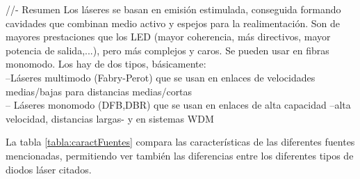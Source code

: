 \begin{itemize}
\begin{itemize}
 					\textcolor{rositaoscuro}{//- Resumen Los láseres se basan en emisión estimulada, conseguida formando cavidades que combinan medio activo y espejos para la realimentación. Son de mayores prestaciones que los LED (mayor coherencia, más directivos, mayor potencia de salida,...), pero más complejos y caros. Se pueden usar en fibras monomodo. Los hay de dos tipos, básicamente:\\
 					--Láseres multimodo (Fabry-Perot) que se usan en enlaces de velocidades medias/bajas para distancias medias/cortas\\
 					-- Láseres monomodo (DFB,DBR) que se usan en enlaces de alta capacidad –alta velocidad, distancias largas- y en sistemas WDM}
 			
 			
 		\end{itemize}
  		
  		La tabla \ref{tabla:caractFuentes} compara las características de las diferentes fuentes mencionadas, permitiendo ver también las diferencias entre los diferentes tipos de diodos láser citados.
  		

\end{itemize}
